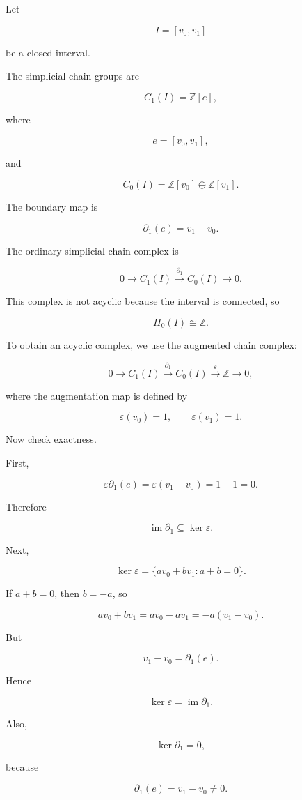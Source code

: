 \documentclass[12pt,a4paper]{article}
\theoremstyle{notespace}
\begin{document}
Let

\[
I=[v_0,v_1]
\]

be a closed interval.

The simplicial chain groups are

\[
C_1(I)=\mathbb Z[e],
\]

where

\[
e=[v_0,v_1],
\]

and

\[
C_0(I)=\mathbb Z[v_0]\oplus \mathbb Z[v_1].
\]

The boundary map is

\[
\partial_1(e)=v_1-v_0.
\]

The ordinary simplicial chain complex is

\[
0\longrightarrow C_1(I)
\xrightarrow{\partial_1}
C_0(I)
\longrightarrow 0.
\]

This complex is not acyclic because the interval is connected, so

\[
H_0(I)\cong \mathbb Z.
\]

To obtain an acyclic complex, we use the augmented chain complex:

\[
0\longrightarrow C_1(I)
\xrightarrow{\partial_1}
C_0(I)
\xrightarrow{\varepsilon}
\mathbb Z
\longrightarrow 0,
\]

where the augmentation map is defined by

\[
\varepsilon(v_0)=1,
\qquad
\varepsilon(v_1)=1.
\]

Now check exactness.

First,

\[
\varepsilon\partial_1(e)
=
\varepsilon(v_1-v_0)
=
1-1
=
0.
\]

Therefore

\[
\operatorname{im}\partial_1\subseteq \ker\varepsilon.
\]

Next,

\[
\ker \varepsilon
=
\{a v_0+b v_1:a+b=0\}.
\]

If \(a+b=0\), then \(b=-a\), so

\[
a v_0+b v_1
=
a v_0-a v_1
=
-a(v_1-v_0).
\]

But

\[
v_1-v_0=\partial_1(e).
\]

Hence

\[
\ker\varepsilon=\operatorname{im}\partial_1.
\]

Also,

\[
\ker\partial_1=0,
\]

because

\[
\partial_1(e)=v_1-v_0\neq 0.
\]
\end{document}
